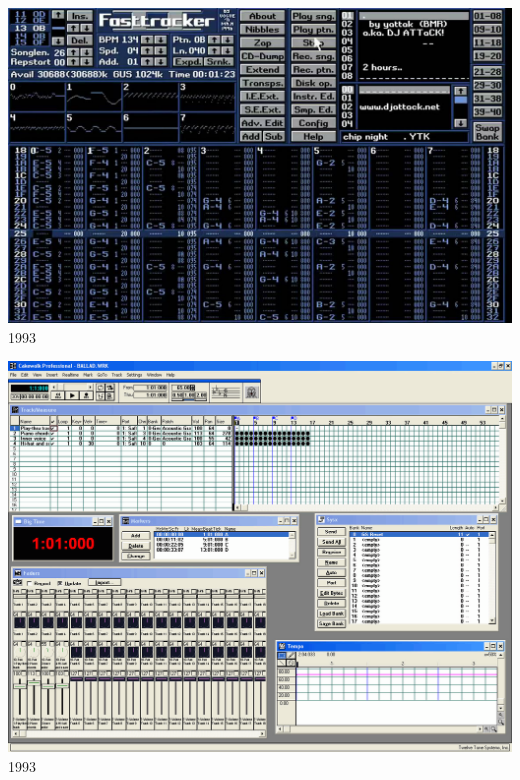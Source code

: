 \documentclass{beamer}
\begin{document}
\begin{frame}
  \begin{center}
    \includegraphics[scale=0.278]{images/fasttracker2.jpg}\\
    1993
  \end{center}
\end{frame}

\begin{frame}
  \begin{center}
    \includegraphics[scale=0.2015]{images/cakewalk.png}\\
    1993
  \end{center}
\end{frame}
\end{document}
